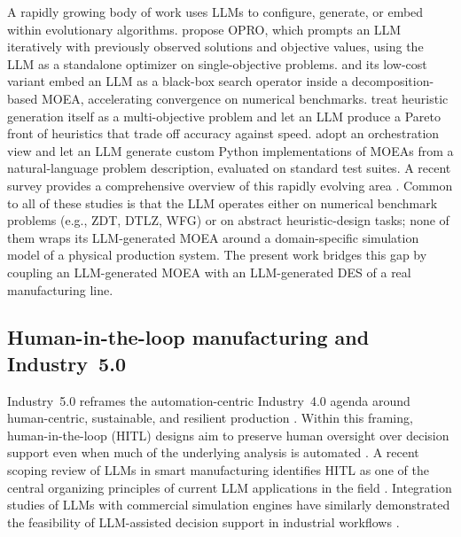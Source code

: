 \documentclass[a4paper,fleqn]{cas-sc}
\begin{document}
  A rapidly growing body of work uses LLMs to configure, generate, or embed within evolutionary algorithms.             
  \citet{Yang2024opro} propose OPRO, which prompts an LLM iteratively with previously observed solutions and objective
  values, using the LLM as a standalone optimizer on single-objective problems. \citet{Liu2024llm4moea} and its low-cost
   variant \citep{Liu2024lowcost} embed an LLM as a black-box search operator inside a decomposition-based MOEA,     
  accelerating convergence on numerical benchmarks. \citet{Yao2025meoh} treat heuristic generation itself as a
  multi-objective problem and let an LLM produce a Pareto front of heuristics that trade off accuracy against speed. 
  \citet{Huang2025tevc} adopt an orchestration view and let an LLM generate custom Python implementations of MOEAs from
  a natural-language problem description, evaluated on standard test suites. A recent survey provides a comprehensive   
  overview of this rapidly evolving area \citep{Zhang2026survey}.  Common to all of these studies is that the LLM operates either on numerical benchmark problems (e.g., ZDT, DTLZ, WFG) 
  or on abstract heuristic-design tasks; none of them wraps its LLM-generated MOEA around a domain-specific simulation
  model of a physical production system. The present work bridges this gap by coupling an LLM-generated MOEA with an
  LLM-generated DES of a real manufacturing line.                               

\subsection{Human-in-the-loop manufacturing and Industry~5.0}\label{sec:related-hitl} 


Industry~5.0 reframes the automation-centric Industry~4.0 agenda around human-centric, sustainable, and resilient     
  production \citep{Toth2023,Xu2021}. Within this framing, human-in-the-loop (HITL) designs aim to preserve human
  oversight over decision support even when much of the underlying analysis is automated \citep{Turner2022hitl}. A      
  recent scoping review of LLMs in smart manufacturing identifies HITL as one of the central organizing principles of
  current LLM applications in the field \citep{Hitl2026review}. Integration studies of LLMs with commercial simulation
  engines have similarly demonstrated the feasibility of LLM-assisted decision support in industrial workflows       
  \citep{SimGPT2026cie}.
\end{document}
